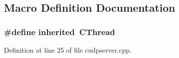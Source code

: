 \subsection{Macro Definition Documentation}
\subsubsection[{inherited}]{\setlength{\rightskip}{0pt plus 5cm}\#define inherited~C\-Thread}\label{cudpserver_8cpp_a3920e3b7cb0909b941b2409493acf8f1}


Definition at line 25 of file cudpserver.\-cpp.

